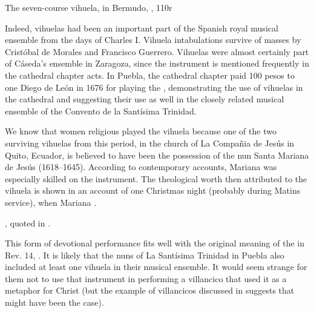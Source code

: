 
{The seven-course vihuela, in Bermudo, , 110r}

Indeed, vihuelas had been an important part of the Spanish royal musical ensemble
from the days of Charles I.
Vihuela intabulations survive of masses by Cristóbal de Morales and Francisco
Guerrero.%
    \Autocite{Grove:Vihuela}
Vihuelas were almost certainly part of Cáseda's ensemble in Zaragoza, since the
instrument is mentioned frequently in the cathedral chapter acts.%
    \Autocite{Calahorra:Zaragoza2}
In Puebla, the cathedral chapter paid 100 pesos to one Diego de León in 1676
for playing the , demonstrating the use of vihuelas in
the cathedral and suggesting their use as well in the closely related musical
ensemble of the Convento de la Santísima Trinidad.%
    \Autocite[44]{PerezRuiz:Aportes}


We know that women religious played the vihuela because one of the two
surviving vihuelas from this period, in the church of La Compañia de Jesús in
Quito, Ecuador, is believed to have been the possession of the nun Santa
Mariana de Jesús (1618--1645).
According to contemporary accounts, Mariana was especially skilled on the
instrument. 
The theological worth then attributed to the vihuela is shown in an account of
one Christmas night (probably during Matins service), when Mariana .%
\begin{Footnote}
    \Autocite[275]{EspinosaPolit:SantaMariana}, quoted in
    \Autocite[73]{Bermudez:Vihuela}.
\end{Footnote}
This form of devotional performance fits well with the original meaning of the
 in Rev. 14, .%
    \Autocite{BDAG}
It is likely that the nuns of La Santísima Trinidad in Puebla also included at
least one vihuela in their musical ensemble.
It would seem strange for them not to use that instrument in performing a
villancico that used it as a metaphor for Christ (but the example of
 villancicos discussed in  suggests that might
have been the case).


